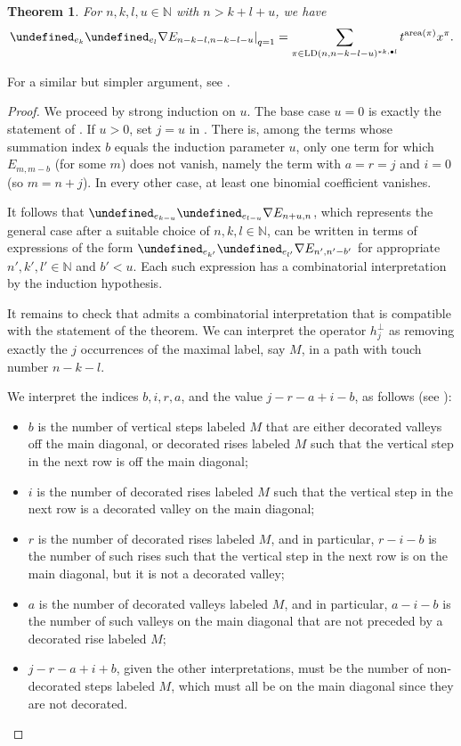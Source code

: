 \documentclass[reqno]{amsart}
\theoremstyle{plain}
\newtheorem{theorem}{Theorem}[section]
\theoremstyle{definition}
\theoremstyle{remark}
\DeclareMathOperator{\LD}{LD}
\DeclareMathOperator{\area}{area}
\let\oldTheta\Theta
\let\Theta\undefined
\DeclareMathOperator{\Theta}{\oldTheta}
\newcommand{\<}{\langle}
\renewcommand{\>}{\rangle}
\begin{document}
\begin{theorem}
    \label{thm:combinatorial_recursion}
    For $n,k,l,u \in \mathbb{N}$ with $n > k+l+u$, we have
    \[ \left.\Theta_{e_k} \Theta_{e_l} \nabla E_{n-k-l, n-k-l-u} \right\rvert_{q=1} = \sum_{\pi \in \LD(n, n-k-l-u)^{\ast k, \bullet l}} t^{\area(\pi)} x^\pi. \]  
\end{theorem}

For a similar but simpler argument, see \cite[Theorem~4.8]{IraciNadeauVandenWyngaerd2024Smirnov}.

\begin{proof}
    We proceed by strong induction on $u$. The base case $u=0$ is exactly the statement of 
    . If $u > 0$, set $j=u$ in . There is, among the terms whose summation index $b$ equals the induction parameter $u$, only one term for which $E_{m,m-b}$ (for some $m$) does not vanish, namely the term with $a=r=j$ and $i=0$ (so $m=n+j$). In every other case, at least one binomial coefficient vanishes.
    
    It follows that $\Theta_{e_{k-u}} \Theta_{e_{l-u}} \nabla E_{n+u,n}$, which represents the general case after a suitable choice of $n,k,l \in \mathbb{N}$, can be written in terms of expressions of the form $\Theta_{e_{k'}} \Theta_{e_{l'}} \nabla E_{n',n'-b'}$ for appropriate $n',k',l' \in \mathbb{N}$ and $b'<u$. Each such expression has a combinatorial interpretation by the induction hypothesis. 

    It remains to check that  admits a combinatorial interpretation that is compatible with the statement of the theorem. We can interpret the operator $h_j^\perp$ as removing exactly the $j$ occurrences of the maximal label, say $M$, in a path with touch number $n-k-l$.
    
    We interpret the indices $b, i, r, a$, and the value $j-r-a+i-b$, as follows (see ):
    \begin{itemize}
        \item $b$ is the number of vertical steps labeled $M$ that are either decorated valleys off the main diagonal, or decorated rises labeled $M$ such that the vertical step in the next row is off the main diagonal;
        \item $i$ is the number of decorated rises labeled $M$ such that the vertical step in the next row is a decorated valley on the main diagonal;
        \item $r$ is the number of decorated rises labeled $M$, and in particular, $r-i-b$ is the number of such rises such that the vertical step in the next row is on the main diagonal, but it is not a decorated valley;
        \item $a$ is the number of decorated valleys labeled $M$, and in particular, $a-i-b$ is the number of such valleys on the main diagonal that are not preceded by a decorated rise labeled $M$;
        \item $j-r-a+i+b$, given the other interpretations, must be the number of non-decorated steps labeled $M$, which must all be on the main diagonal since they are not decorated.
    \end{itemize}


\end{proof}
\end{document}
